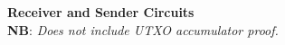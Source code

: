 \documentclass{article}
\begin{document}



\begin{center}
    \Large{\textbf{Receiver and Sender Circuits}} \\
    \small{\textbf{NB}: \textit{Does not include UTXO accumulator proof.}}
\end{center}

\vspace{-1em}
\end{document}
